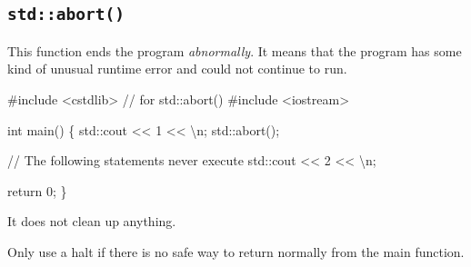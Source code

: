 \documentclass[
  letterpaper,
  DIV=11,
  numbers=noendperiod]{scrreprt}
\newenvironment{Shaded}{\begin{snugshade}}{\end{snugshade}}
\newcommand{\CommentTok}[1]{\textcolor[rgb]{0.37,0.37,0.37}{#1}}
\newcommand{\DecValTok}[1]{\textcolor[rgb]{0.68,0.00,0.00}{#1}}
\newcommand{\ErrorTok}[1]{\textcolor[rgb]{0.68,0.00,0.00}{#1}}
\newcommand{\FunctionTok}[1]{\textcolor[rgb]{0.28,0.35,0.67}{#1}}
\newcommand{\NormalTok}[1]{\textcolor[rgb]{0.00,0.23,0.31}{#1}}
\newcommand{\SpecialCharTok}[1]{\textcolor[rgb]{0.37,0.37,0.37}{#1}}
\newcommand{\StringTok}[1]{\textcolor[rgb]{0.13,0.47,0.30}{#1}}
\begin{document}
\hypertarget{stdabort}{%
\subsection{\texorpdfstring{\texttt{std::abort()}}{std::abort()}}\label{stdabort}}

This function ends the program \emph{abnormally}. It means that the
program has some kind of unusual runtime error and could not continue to
run.

\begin{Shaded}
\begin{Highlighting}[]
\CommentTok{\#include \textless{}cstdlib\textgreater{} // for std::abort()}
\CommentTok{\#include \textless{}iostream\textgreater{}}

\NormalTok{int }\FunctionTok{main}\NormalTok{()}
\NormalTok{\{}
\NormalTok{    std}\SpecialCharTok{::}\NormalTok{cout }\SpecialCharTok{\textless{}}\ErrorTok{\textless{}} \DecValTok{1} \SpecialCharTok{\textless{}}\ErrorTok{\textless{}} \StringTok{\textquotesingle{}}\SpecialCharTok{\textbackslash{}n}\StringTok{\textquotesingle{}}\NormalTok{;}
\NormalTok{    std}\SpecialCharTok{::}\FunctionTok{abort}\NormalTok{();}

    \SpecialCharTok{/}\ErrorTok{/}\NormalTok{ The following statements never execute}
\NormalTok{    std}\SpecialCharTok{::}\NormalTok{cout }\SpecialCharTok{\textless{}}\ErrorTok{\textless{}} \DecValTok{2} \SpecialCharTok{\textless{}}\ErrorTok{\textless{}} \StringTok{\textquotesingle{}}\SpecialCharTok{\textbackslash{}n}\StringTok{\textquotesingle{}}\NormalTok{;}

\NormalTok{    return }\DecValTok{0}\NormalTok{;}
\NormalTok{\}}
\end{Highlighting}
\end{Shaded}

It does not clean up anything.

\begin{tcolorbox}[enhanced jigsaw, toprule=.15mm, rightrule=.15mm, opacityback=0, breakable, leftrule=.75mm, colback=white, colframe=quarto-callout-tip-color-frame, arc=.35mm, left=2mm, bottomrule=.15mm]
\begin{minipage}[t]{5.5mm}
\textcolor{quarto-callout-tip-color}{\faLightbulb}
\end{minipage}%
\begin{minipage}[t]{\textwidth - 5.5mm}

Only use a halt if there is no safe way to return normally from the main
function.

\end{minipage}%
\end{tcolorbox}
\end{document}
